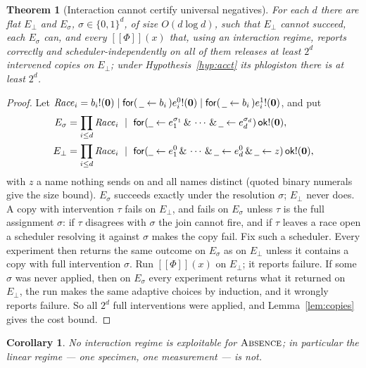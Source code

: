 \documentclass[11pt]{article}
\theoremstyle{definition}
\theoremstyle{plain}
\newtheorem{theorem}[definition]{Theorem}
\newtheorem{corollary}[definition]{Corollary}
\theoremstyle{remark}
\newcommand{\inp}[3]{\mathsf{for}(\,#1 \leftarrow #2\,)#3}
\newcommand{\out}[2]{#1!(#2)}
\newcommand{\enc}[1]{[\![#1]\!]}
\newcommand{\nil}{\mathbf{0}}
\newcommand{\wild}{\mathord{\underline{\hspace{0.5em}}}}
\newcommand{\ok}{\mathsf{ok}}
\newcommand{\ABS}{\textup{\textsc{Absence}}}
\begin{document}
\begin{theorem}[Interaction cannot certify universal negatives]
\label{thm:blackbox}
For each $d$ there are flat $E_\bot$ and $E_\sigma$, $\sigma \in
\{0,1\}^d$, of size $O(d \log d)$, such that $E_\bot$ cannot succeed,
each $E_\sigma$ can, and every $\enc{\Phi}(x)$ that, using an interaction
regime, reports correctly and scheduler-independently on all of them
releases at least $2^d$ intervened copies on $E_\bot$; under
Hypothesis~\ref{hyp:acct} its phlogiston there is at least $2^d$.
\end{theorem}

\begin{proof}
Let $\mathit{Race}_i = \out{b_i}{\nil} \mid
\inp{\wild}{b_i}{\out{e_i^0}{\nil}} \mid
\inp{\wild}{b_i}{\out{e_i^1}{\nil}}$, and put
\[
\begin{aligned}
E_\sigma &= \prod_{i \le d} \mathit{Race}_i \ \mid\
  \mathsf{for}(\wild \leftarrow e_1^{\sigma_1} \,\&\, \cdots \,\&\,
  \wild \leftarrow e_d^{\sigma_d})\, \out{\ok}{\nil},\\
E_\bot &= \prod_{i \le d} \mathit{Race}_i \ \mid\
  \mathsf{for}(\wild \leftarrow e_1^0 \,\&\, \cdots \,\&\,
  \wild \leftarrow e_d^0 \,\&\, \wild \leftarrow z)\, \out{\ok}{\nil},
\end{aligned}
\]
with $z$ a name nothing sends on and all names distinct (quoted binary
numerals give the size bound). $E_\sigma$ succeeds exactly under the resolution
$\sigma$; $E_\bot$ never does. A copy with intervention $\tau$ fails on
$E_\bot$, and fails on $E_\sigma$ unless $\tau$ is the full assignment
$\sigma$: if $\tau$ disagrees with $\sigma$ the join cannot fire, and if
$\tau$ leaves a race open a scheduler resolving it against $\sigma$ makes
the copy fail. Fix such a scheduler. Every experiment then returns the
same outcome on $E_\sigma$ as on $E_\bot$ unless it contains a copy with
full intervention $\sigma$. Run $\enc{\Phi}(x)$ on $E_\bot$; it reports
failure. If some $\sigma$ was never applied, then on $E_\sigma$ every
experiment returns what it returned on $E_\bot$, the run makes the same
adaptive choices by induction, and it wrongly reports failure. So all
$2^d$ full interventions were applied, and Lemma~\ref{lem:copies} gives
the cost bound.
\end{proof}

\begin{corollary}\label{cor:nobb}
No interaction regime is exploitable for $\ABS$; in
particular the linear regime --- one specimen, one measurement --- is
not.
\end{corollary}
\end{document}
